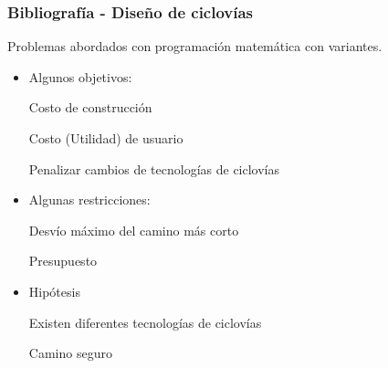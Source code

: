 \documentclass[aspectratio=43, 10pt]{beamer}
\begin{document}
\begin{frame}
    \frametitle{Bibliografía - Diseño de ciclovías}

    Problemas abordados con programación matemática con variantes.

\begin{itemize} \item{
        Algunos objetivos:
        \begin{description}
        \item[Costo de construcción] \parencite{Duthie2014}
        \item[Costo (Utilidad) de usuario] \parencite{Mauttone2017, Liu2019, baya2021}
        \item[Penalizar cambios de tecnologías de ciclovías] \parencite{baya2021}
        \end{description}
    }
    \item{
        Algunas restricciones:
        \begin{description}
        \item[Desvío máximo del camino más corto] \parencite{Duthie2014, lim2021}
        \item[Presupuesto]
        \end{description}
    }
    \item{
            Hipótesis
            \begin{description}
            \item[Existen diferentes tecnologías de ciclovías]\parencite{baya2021, Zhu2019}
            \item[Camino seguro] \parencite{Duthie2014, lim2021}
            \end{description}
    }
    \end{itemize}
\end{frame}

\end{document}
